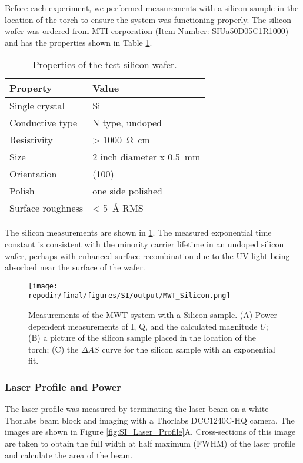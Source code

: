 Before each experiment, we performed measurements with a silicon sample in the location of the torch to ensure the system was functioning properly. The silicon wafer was ordered from MTI corporation (Item Number: SIUa50D05C1R1000) and has the properties shown in Table \ref{table:material_properties}.

\begin{table}[h]
\centering
\caption{Properties of the test silicon wafer.}
\begin{tabular}{|l|l|}
\hline
Property & Value \\
\hline
Single crystal & Si \\
Conductive type & N type, undoped \\
Resistivity & > \SI{1000} {\ohm\centi\meter} \\
Size & 2 inch diameter x \SI{0.5} {\milli\meter} \\
Orientation & (100) \\
Polish & one side polished \\
Surface roughness & < \SI{5} {\angstrom} RMS \\
\hline
\end{tabular}
\label{table:material_properties}
\end{table}

The silicon measurements are shown in \ref{fig:SI_MWT_Silicon}. The measured exponential time constant is consistent with the minority carrier lifetime in an undoped silicon wafer, perhaps with enhanced surface recombination due to the UV light being absorbed near the surface of the wafer. \cite{tyagiMINORITYCARRIERRECOMBINATION, delalamoModellingMinoritycarrierTransport1987} %

\begin{figure}[]
\centering
\texttt{[image: \\repodir/final/figures/SI/output/MWT\_Silicon.png]}
\caption{Measurements of the MWT system with a Silicon sample. (A) Power dependent measurements of I, Q, and the calculated magnitude $U$; (B) a picture of the silicon sample placed in the location of the torch; (C) the $\Delta AS$ curve for the silicon sample with an exponential fit. }
\label{fig:SI_MWT_Silicon}
\end{figure}

\clearpage
\subsubsection{Laser Profile and Power}

The laser profile was measured by terminating the laser beam on a white Thorlabs beam block and imaging with a Thorlabs DCC1240C-HQ camera. The images are shown in Figure \ref{fig:SI_Laser_Profile}A. Cross-sections of this image are taken to obtain the full width at half maximum (FWHM) of the laser profile and calculate the area of the beam. 

